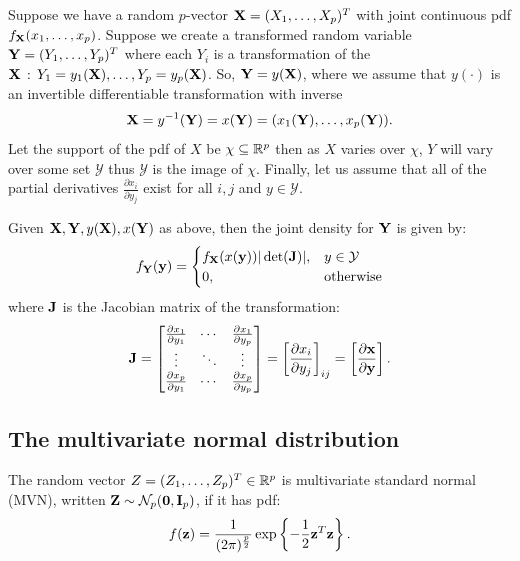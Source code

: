 \documentclass[10pt, a4paper]{article}
\begin{document}
\begin{theorem}
    Suppose we have a random $p$-vector $\mathbf{X} = (X_1, \dotsc, X_p) ^ T$ with joint continuous pdf $f_{\mathbf{X}}(x_1, \dotsc, x_p)$.
    Suppose we create a transformed random variable $\mathbf{Y} = (Y_1, \dotsc, Y_p) ^ T$ where each $Y_i$ is a transformation of the $\mathbf{X}\,:\, Y_1 = y_1(\mathbf{X}), \dotsc, Y_p = y_p(\mathbf{X})$.
    So,
    $\mathbf{Y} = y(\mathbf{X})$,
    where we assume that $y(\cdot)$ is an invertible differentiable transformation with inverse
    \[
    \mathbf{X} = y ^ {-1}(\mathbf{Y}) = x(\mathbf{Y}) = (x_1(\mathbf{Y}), \dotsc, x_p(\mathbf{Y})).
    \]
    Let the support of the pdf of $X$ be $\chi \subseteq \mathbb{R} ^ p$ then as $X$ varies over $\chi$,
    $Y$ will vary over some set $\mathcal{Y}$ thus $\mathcal{Y}$ is the image of $\chi$.
    Finally,
    let us assume that all of the partial derivatives $\frac{\partial x_i}{\partial y_j}$ exist for all $i, j$ and $y \in \mathcal{Y}$.

    Given $\mathbf{X}, \mathbf{Y}, y(\mathbf{X}), x(\mathbf{Y})$ as above,
    then the joint density for $\mathbf{Y}$ is given by:
    \[
    f_{\mathbf{Y}}(\mathbf{y}) = \begin{cases}
        f_{\mathbf{X}}(x(\mathbf{y}))|\det(\mathbf{J})|, & y \in \mathcal{Y} \\
        0, & \text{otherwise}
    \end{cases}
    \]
    where $\mathbf{J}$ is the Jacobian matrix of the transformation:
    \[
    \mathbf{J} = \begin{bmatrix}
        \frac{\partial x_1}{\partial y_1} & \dotsi & \frac{\partial x_1}{\partial y_p} \\
        \vdots & \ddots & \vdots \\
        \frac{\partial x_p}{\partial y_1} & \dotsi & \frac{\partial x_p}{\partial y_p}
    \end{bmatrix}
    = \left[\frac{\partial x_i}{\partial y_j}\right]_{ij} = \left[\frac{\partial\mathbf{x}}{\partial\mathbf{y}}\right].
    \]
\end{theorem}

\subsection{The multivariate normal distribution}
\begin{definition}
    The random vector $Z = (Z_1, \dotsc, Z_p) ^ T \in \mathbb{R} ^ p$ is multivariate standard normal
    (MVN),
    written $\mathbf{Z} \sim \mathcal{N}_p(\mathbf{0}, \mathbf{I}_p)$,
    if it has pdf:
    \[
    f(\mathbf{z}) = \frac{1}{(2\pi) ^ {\frac{p}{2}}}\exp\left\{-\frac{1}{2}\mathbf{z} ^ T\mathbf{z}\right\}.
    \]
\end{definition}
\end{document}
